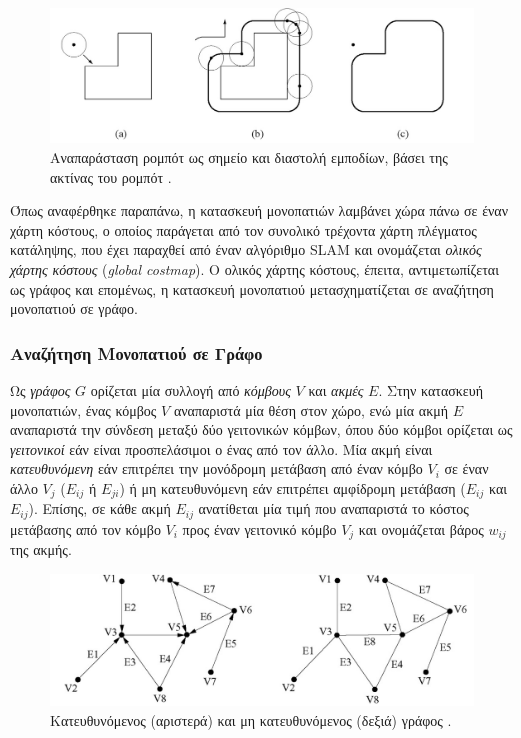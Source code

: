 \begin{figure}[!ht]
	\centering
	\includegraphics[width = 0.7\linewidth]{Chapters/Chapter3/Figures/point_robot_and_inflated_obstacles.png}
	\caption[Αναπαράσταση ρομπότ ως σημείο και διαστολή εμποδίων, βάσει της ακτίνας του ρομπότ. ]{Αναπαράσταση ρομπότ ως σημείο και διαστολή εμποδίων, βάσει της ακτίνας του ρομπότ \cite{principles_of_robot_motion}.}
	\label{fig:point_robot_and_inflated_obstacles}
\end{figure}

\bigskip
Όπως αναφέρθηκε παραπάνω, η κατασκευή μονοπατιών λαμβάνει χώρα πάνω σε έναν χάρτη κόστους, ο οποίος παράγεται από τον συνολικό τρέχοντα χάρτη πλέγματος κατάληψης, που έχει παραχθεί από έναν αλγόριθμο SLAM και ονομάζεται \textit{ολικός χάρτης κόστους} (\textit{global costmap}). Ο ολικός χάρτης κόστους, έπειτα, αντιμετωπίζεται ως γράφος και επομένως, η κατασκευή μονοπατιού μετασχηματίζεται σε αναζήτηση μονοπατιού σε γράφο.

\bigskip 
\subsubsection{Αναζήτηση Μονοπατιού σε Γράφο}
Ως \textit{γράφος} $G$ ορίζεται μία συλλογή από \textit{κόμβους} $V$ και \textit{ακμές} $E$. Στην κατασκευή μονοπατιών, ένας κόμβος $V$ αναπαριστά μία θέση στον χώρο, ενώ μία ακμή $E$ αναπαριστά την σύνδεση μεταξύ δύο γειτονικών κόμβων, όπου δύο κόμβοι ορίζεται ως \textit{γειτονικοί} εάν είναι προσπελάσιμοι ο ένας από τον άλλο. Μία ακμή είναι \textit{κατευθυνόμενη} εάν επιτρέπει την μονόδρομη μετάβαση από έναν κόμβο $V_i$ σε έναν άλλο $V_j$ ($E_{ij}$ ή $E_{ji}$) ή μη κατευθυνόμενη εάν επιτρέπει αμφίδρομη μετάβαση ($E_{ij}$ και $E_{ij}$). Επίσης, σε κάθε ακμή $E_{ij}$ ανατίθεται μία τιμή που αναπαριστά το κόστος μετάβασης από τον κόμβο $V_i$ προς έναν γειτονικό κόμβο $V_j$ και ονομάζεται βάρος $w_{ij}$ της ακμής.

\begin{figure}[!ht]
	\centering
	\includegraphics[width=0.6\linewidth]{Chapters/Chapter3/Figures/directed_and_non_graph.png}
	\caption[Κατευθυνόμενος (αριστερά) και μη κατευθυνόμενος (δεξιά) γράφος.]{Κατευθυνόμενος (αριστερά) και μη κατευθυνόμενος (δεξιά) γράφος \cite{principles_of_robot_motion}.}
	\label{fig:directed_and_non_graph}
\end{figure}

